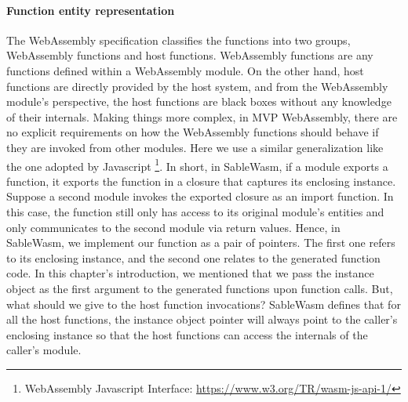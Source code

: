 \paragraph{Function entity representation}
The WebAssembly specification classifies the functions into two groups,
WebAssembly functions and host functions. WebAssembly functions are any
functions defined within a WebAssembly module. On the other hand, host
functions are directly provided by the host system, and from the WebAssembly
module's perspective, the host functions are black boxes without any knowledge
of their internals. Making things more complex, in MVP WebAssembly, there are no
explicit requirements on how the WebAssembly functions should behave if they
are invoked from other modules. Here we use a similar generalization like the
one adopted by Javascript \footnote{WebAssembly Javascript Interface:
    \url{https://www.w3.org/TR/wasm-js-api-1/}}. In short, in SableWasm, if a
module exports a function, it exports the function in a closure that captures
its enclosing instance. Suppose a second module invokes the exported closure
as an import function. In this case, the function still only has access to its
original module's entities and only communicates to the second module via
return values. Hence, in SableWasm, we implement our function as a pair of
pointers. The first one refers to its enclosing instance, and the second one
relates to the generated function code. In this chapter's introduction, we
mentioned that we pass the instance object as the first argument to the
generated functions upon function calls. But, what should we give to the host
function invocations? SableWasm defines that for all the host functions, the
instance object pointer will always point to the caller's enclosing instance
so that the host functions can access the internals of the caller's module.

